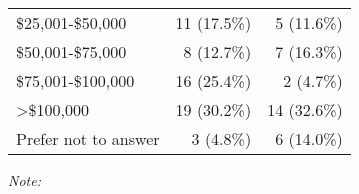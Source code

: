 \documentclass[
  pub,floatsintext]{apa6}
\begin{document}
\begin{table}[!h]
\begin{threeparttable}
\begin{tabular}[t]{lrr}
\hspace{1em}\$25,001-\$50,000 & 11 (17.5\%) & 5 (11.6\%)\\
\hspace{1em}\$50,001-\$75,000 & 8 (12.7\%) & 7 (16.3\%)\\
\hspace{1em}\$75,001-\$100,000 & 16 (25.4\%) & 2 (4.7\%)\\
\hspace{1em}>\$100,000 & 19 (30.2\%) & 14 (32.6\%)\\
\hspace{1em}Prefer not to answer & 3 (4.8\%) & 6 (14.0\%)\\
\bottomrule
\end{tabular}
\begin{tablenotes}
\item \textit{Note: } 
\item 
\end{tablenotes}
\end{threeparttable}
\end{table}
\end{document}
